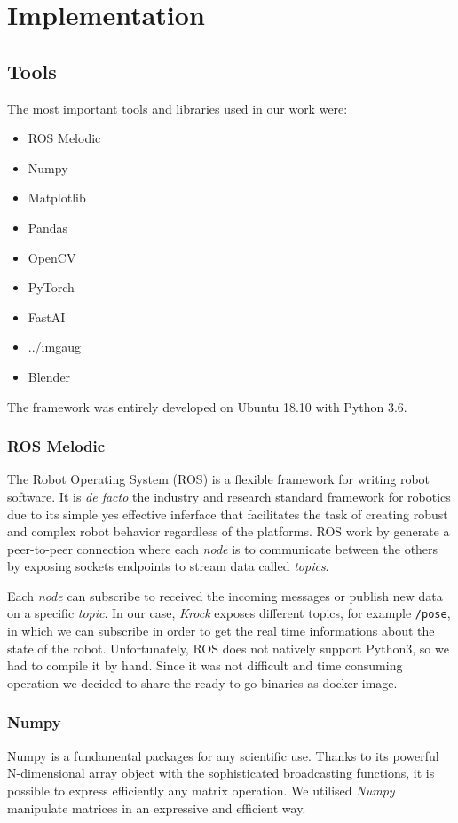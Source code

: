 \documentclass[../document.tex]{subfiles}
\begin{document}
\section{Implementation}

\subsection{Tools}
The most important tools and libraries used in our work were:

\begin{itemize}
	\item ROS Melodic
	\item Numpy
	\item Matplotlib
	\item Pandas
	\item OpenCV
	\item PyTorch
	\item FastAI
	\item ../imgaug
	\item Blender
\end{itemize}
The framework was entirely developed on Ubuntu 18.10 with Python 3.6.

\subsubsection{ROS Melodic}
The Robot Operating System (ROS) \cite{ROS} is a flexible framework for writing robot software. It is \emph{de facto} the industry and research standard framework for robotics due to its simple yes effective inferface that facilitates the task of creating robust and complex robot behavior regardless of the platforms. ROS work by generate a peer-to-peer connection where each \emph{node} is to communicate between the others by exposing sockets endpoints to stream data called \emph{topics}. 

Each \emph{node} can subscribe to received the incoming messages or publish new data on a specific \emph{topic}. In our case, \emph{Krock} exposes different topics, for example \texttt{/pose}, in which we can subscribe in order to get the real time informations about the state of the robot.
Unfortunately, ROS does not natively support Python3, so we had to compile it by hand. Since it was not difficult and time consuming operation we decided to share the ready-to-go binaries as docker image. 

\subsubsection{Numpy}
Numpy is a fundamental packages for any scientific use. Thanks to its powerful N-dimensional array object with the sophisticated broadcasting functions, it is possible to express efficiently any matrix operation. We utilised \emph{Numpy} manipulate matrices in an expressive and efficient way.
\end{document}
